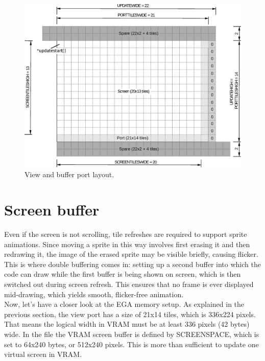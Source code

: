 \documentclass[book.tex]{subfiles}
\begin{document}
\begin{figure}[H]
\centering
\includegraphics[width=\textwidth]{imgs/drawings/buffer_tile_layout.eps}
\caption{View and buffer port layout.}
\label{fig:screen_setup}
\end{figure}



\section{Screen buffer}
Even if the screen is not scrolling, tile refreshes are required to support sprite animations. Since moving a sprite in this way involves first erasing it and then redrawing it, the image of the erased sprite may be visible briefly, causing flicker. This is where double buffering comes in: setting up a second buffer into which the code can draw while the first buffer is being shown on screen, which is then switched out during screen refresh. This ensures that no frame is ever displayed mid-drawing, which yields smooth, flicker-free animation.\\

Now, let's have a closer look at the EGA memory setup. As explained in the previous section, the view port has a size of 21x14 tiles, which is 336x224 pixels. That means the logical width in VRAM must be at least 336 pixels (42 bytes) wide. In the file  the VRAM screen buffer is defined by SCREENSPACE, which is set to 64x240 bytes, or 512x240 pixels. This is more than sufficient to update one virtual screen in VRAM.\\
\end{document}
